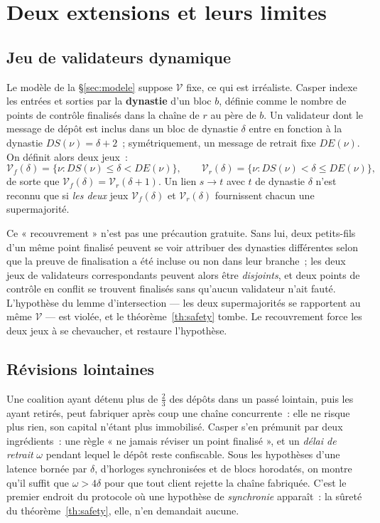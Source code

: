 \documentclass[11pt,a4paper]{article}
\theoremstyle{plain}
\theoremstyle{definition}
\newcommand{\Vv}{\mathcal{V}}
\begin{document}
\section{Deux extensions et leurs limites}\label{sec:limites}

\subsection{Jeu de validateurs dynamique}

Le modèle de la §\ref{sec:modele} suppose $\Vv$ fixe, ce qui est irréaliste. Casper indexe
les entrées et sorties par la \textbf{dynastie} d'un bloc $b$, définie comme le nombre de
points de contrôle finalisés dans la chaîne de $r$ au père de $b$. Un validateur dont le
message de dépôt est inclus dans un bloc de dynastie $\delta$ entre en fonction à la dynastie
$DS(\nu)=\delta+2$~; symétriquement, un message de retrait fixe $DE(\nu)$. On définit alors
deux jeux~:
\[ \Vv_f(\delta)=\{\nu : DS(\nu)\le \delta<DE(\nu)\},\qquad
   \Vv_r(\delta)=\{\nu : DS(\nu)< \delta\le DE(\nu)\}, \]
de sorte que $\Vv_f(\delta)=\Vv_r(\delta+1)$. Un lien $s\to t$ avec $t$ de dynastie $\delta$
n'est reconnu que si \emph{les deux} jeux $\Vv_f(\delta)$ et $\Vv_r(\delta)$ fournissent
chacun une supermajorité.

Ce « recouvrement » n'est pas une précaution gratuite. Sans lui, deux petits-fils d'un même
point finalisé peuvent se voir attribuer des dynasties différentes selon que la preuve de
finalisation a été incluse ou non dans leur branche~; les deux jeux de validateurs
correspondants peuvent alors être \emph{disjoints}, et deux points de contrôle en conflit se
trouvent finalisés sans qu'aucun validateur n'ait fauté. L'hypothèse du lemme
d'intersection — les deux supermajorités se rapportent au même $\Vv$ — est violée, et le
théorème~\ref{th:safety} tombe. Le recouvrement force les deux jeux à se chevaucher, et
restaure l'hypothèse.

\subsection{Révisions lointaines}

Une coalition ayant détenu plus de $\tfrac23$ des dépôts dans un passé lointain, puis les
ayant retirés, peut fabriquer après coup une chaîne concurrente~: elle ne risque plus rien,
son capital n'étant plus immobilisé. Casper s'en prémunit par deux ingrédients~: une règle
« ne jamais réviser un point finalisé », et un \emph{délai de retrait} $\omega$ pendant lequel
le dépôt reste confiscable. Sous les hypothèses d'une latence bornée par $\delta$, d'horloges
synchronisées et de blocs horodatés, on montre qu'il suffit que $\omega>4\delta$ pour que
tout client rejette la chaîne fabriquée. C'est le premier endroit du protocole où une
hypothèse de \emph{synchronie} apparaît~: la sûreté du théorème~\ref{th:safety}, elle, n'en
demandait aucune.
\end{document}
